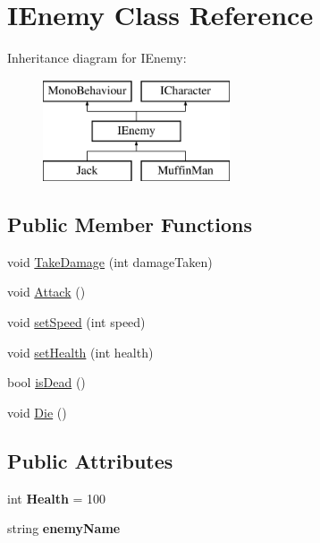 \hypertarget{class_i_enemy}{}\section{I\+Enemy Class Reference}
\label{class_i_enemy}
Inheritance diagram for I\+Enemy\+:\begin{figure}[H]
\begin{center}
\leavevmode
\includegraphics[height=3.000000cm]{class_i_enemy}
\end{center}
\end{figure}
\subsection*{Public Member Functions}
\begin{DoxyCompactItemize}
\item 
void \mbox{\hyperlink{class_i_enemy_af9c3000cf4db4888aa1be7e6db70240f}{Take\+Damage}} (int damage\+Taken)
\item 
void \mbox{\hyperlink{class_i_enemy_aa7214edc7d35f1684009bba6f34387b7}{Attack}} ()
\item 
void \mbox{\hyperlink{class_i_enemy_aef93bc3d389f8b290b0eb4f12dc329f4}{set\+Speed}} (int speed)
\item 
void \mbox{\hyperlink{class_i_enemy_aa8f554e318bad0827c6186e6ae46fbd4}{set\+Health}} (int health)
\item 
bool \mbox{\hyperlink{class_i_enemy_ab4b9b90ff23a48388ba9fb3fd794a282}{is\+Dead}} ()
\item 
void \mbox{\hyperlink{class_i_enemy_a53c76db616e0e102f1ddd3cfe2c8ed28}{Die}} ()
\end{DoxyCompactItemize}
\subsection*{Public Attributes}
\begin{DoxyCompactItemize}
\item 
\mbox{\label{class_i_enemy_a6310c4cf55e1e5814fd9f1c19c9acc2d}} 
int {\bfseries Health} = 100
\item 
\mbox{\label{class_i_enemy_a03e4a34e8acaba49dd074feeb12e1e55}} 
string {\bfseries enemy\+Name}
\end{DoxyCompactItemize}


